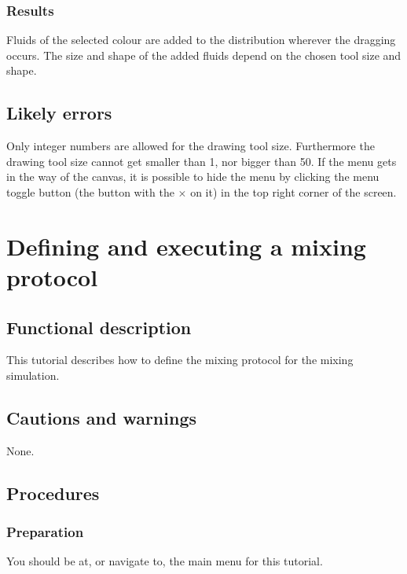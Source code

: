 \subsubsection{Results}
Fluids of the selected colour are added to the distribution wherever the dragging occurs. The size and shape of the added fluids depend on the chosen tool size and shape.

\subsection{Likely errors}
Only integer numbers are allowed for the drawing tool size. Furthermore the drawing tool size cannot get smaller than 1, nor bigger than 50. If the menu gets in the way of the canvas, it is possible to hide the menu by clicking the menu toggle button (the button with the $\times$ on it) in the top right corner of the screen.


\section{Defining and executing a mixing protocol}
\label{sec:defineMixProt}

\subsection{Functional description}
This tutorial describes how to define the mixing protocol for the mixing simulation.

\subsection{Cautions and warnings}
None.

\subsection{Procedures}
\subsubsection{Preparation}
%
You should be at, or navigate to, the main menu for this tutorial.

